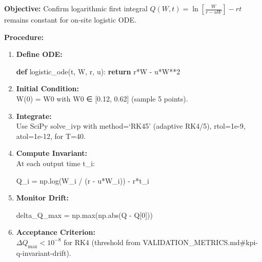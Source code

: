 \documentclass[
]{article}
\newenvironment{Shaded}{}{}
\newcommand{\BuiltInTok}[1]{\textcolor[rgb]{0.00,0.50,0.00}{#1}}
\newcommand{\ControlFlowTok}[1]{\textcolor[rgb]{0.00,0.44,0.13}{\textbf{#1}}}
\newcommand{\DecValTok}[1]{\textcolor[rgb]{0.25,0.63,0.44}{#1}}
\newcommand{\KeywordTok}[1]{\textcolor[rgb]{0.00,0.44,0.13}{\textbf{#1}}}
\newcommand{\NormalTok}[1]{#1}
\newcommand{\OperatorTok}[1]{\textcolor[rgb]{0.40,0.40,0.40}{#1}}
\begin{document}
\textbf{Objective:} Confirm logarithmic first integral
\(Q(W,t) = \ln\!\left[\tfrac{W}{r-uW}\right] - r t\) remains constant
for on-site logistic ODE.

\textbf{Procedure:}

\begin{enumerate}
\def\labelenumi{\arabic{enumi}.}
\item
  \textbf{Define ODE:}

\begin{Shaded}
\begin{Highlighting}[]
\KeywordTok{def}\NormalTok{ logistic\_ode(t, W, r, u):}
    \ControlFlowTok{return}\NormalTok{ r}\OperatorTok{*}\NormalTok{W }\OperatorTok{{-}}\NormalTok{ u}\OperatorTok{*}\NormalTok{W}\OperatorTok{**}\DecValTok{2}
\end{Highlighting}
\end{Shaded}
\item
  \textbf{Initial Condition:}\\
  W(0) = W0 with W0 ∈ {[}0.12, 0.62{]} (sample 5 points).
\item
  \textbf{Integrate:}\\
  Use SciPy solve\_ivp with method=`RK45' (adaptive RK4/5), rtol=1e-9,
  atol=1e-12, for T=40.
\item
  \textbf{Compute Invariant:}\\
  At each output time t\_i:

\begin{Shaded}
\begin{Highlighting}[]
\NormalTok{Q\_i }\OperatorTok{=}\NormalTok{ np.log(W\_i }\OperatorTok{/}\NormalTok{ (r }\OperatorTok{{-}}\NormalTok{ u}\OperatorTok{*}\NormalTok{W\_i)) }\OperatorTok{{-}}\NormalTok{ r}\OperatorTok{*}\NormalTok{t\_i}
\end{Highlighting}
\end{Shaded}
\item
  \textbf{Monitor Drift:}

\begin{Shaded}
\begin{Highlighting}[]
\NormalTok{delta\_Q\_max }\OperatorTok{=}\NormalTok{ np.}\BuiltInTok{max}\NormalTok{(np.}\BuiltInTok{abs}\NormalTok{(Q }\OperatorTok{{-}}\NormalTok{ Q[}\DecValTok{0}\NormalTok{]))}
\end{Highlighting}
\end{Shaded}
\item
  \textbf{Acceptance Criterion:}\\
  \(\Delta Q_{\max} < 10^{-8}\) for RK4 (threshold from
  VALIDATION\_METRICS.md\#kpi-q-invariant-drift).
\end{enumerate}
\end{document}
